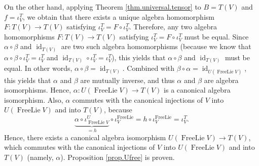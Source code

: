 \documentclass[etingof-lie.tex]{subfiles}
\begin{document}
On the other hand, applying Theorem \ref{thm.universal.tensor} to $B=T\left(
V\right)  $ and $f=\iota_{V}^{T}$, we obtain that there exists a unique
algebra homomorphism $F:T\left(  V\right)  \rightarrow T\left(  V\right)  $
satisfying $\iota_{V}^{T}=F\circ\iota_{V}^{T}$. Therefore, any two algebra
homomorphisms $F:T\left(  V\right)  \rightarrow T\left(  V\right)  $
satisfying $\iota_{V}^{T}=F\circ\iota_{V}^{T}$ must be equal. Since
$\alpha\circ\beta$ and $\operatorname*{id}\nolimits_{T\left(  V\right)  }$ are
two such algebra homomorphisms (because we know that $\alpha\circ\beta
\circ\iota_{V}^{T}=\iota_{V}^{T}$ and $\operatorname*{id}\nolimits_{T\left(
V\right)  }\circ\iota_{V}^{T}=\iota_{V}^{T}$), this yields that $\alpha
\circ\beta$ and $\operatorname*{id}\nolimits_{T\left(  V\right)  }$ must be
equal. In other words, $\alpha\circ\beta=\operatorname*{id}\nolimits_{T\left(
V\right)  }$. Combined with $\beta\circ\alpha=\operatorname*{id}%
\nolimits_{U\left(  \operatorname*{FreeLie}V\right)  }$, this yields that
$\alpha$ and $\beta$ are mutually inverse, and thus $\alpha$ and $\beta$ are
algebra isomorphisms. Hence, $\alpha:U\left(  \operatorname*{FreeLie}V\right)
\rightarrow T\left(  V\right)  $ is a canonical algebra isomorphism. Also,
$\alpha$ commutes with the canonical injections of $V$ into $U\left(
\operatorname*{FreeLie}V\right)  $ and into $T\left(  V\right)  $, because%
\[
\underbrace{\alpha\circ\iota_{\operatorname*{FreeLie}V}^{U}}_{=h}\circ
\iota_{V}^{\operatorname*{FreeLie}}=h\circ\iota_{V}^{\operatorname*{FreeLie}%
}=\iota_{V}^{T}.
\]
Hence, there exists a canonical algebra isomorphism $U\left(
\operatorname*{FreeLie}V\right)  \rightarrow T\left(  V\right)  $, which
commutes with the canonical injections of $V$ into $U\left(
\operatorname*{FreeLie}V\right)  $ and into $T\left(  V\right)  $ (namely,
$\alpha$). Proposition \ref{prop.Ufree} is proven.
\end{document}
